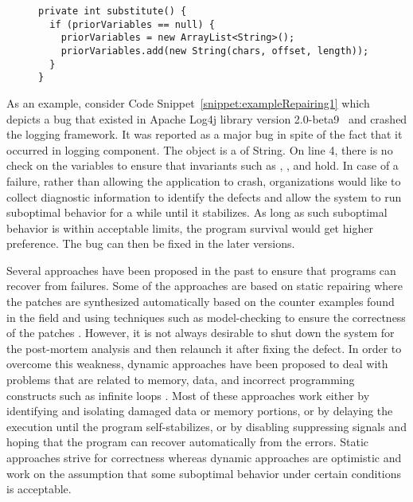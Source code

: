\lstset{language=Java , caption=Apache Log4j bug example,
label=snippet:exampleRepairing1}
\begin{figure}[t]
\begin{lstlisting}
private int substitute() {
  if (priorVariables == null) {
    priorVariables = new ArrayList<String>();
    priorVariables.add(new String(chars, offset, length));
  }
}
\end{lstlisting}
\end{figure}

As an example, consider Code Snippet~\ref{snippet:exampleRepairing1} which depicts a bug that
existed in Apache Log4j library version 2.0-beta9~\cite{ApacheLog4jBug} and crashed
the logging framework. It was reported as a major bug in
spite of the fact that it occurred in logging component. The object
 is a  of String. On line 4, there is no check on the variables to ensure
that invariants such as , , and  hold. In case of a failure, rather than allowing the application to crash, organizations would
like to collect diagnostic information to identify the defects and allow the system to run suboptimal behavior
for a while until it stabilizes. As long as such suboptimal behavior is within acceptable
limits, the program survival would get higher preference. The bug can then be
fixed in the later versions.

Several approaches have been proposed in the past to ensure that programs can
recover from failures. Some of the approaches are based on static repairing
where the patches are synthesized automatically based on the counter examples
found in the field and using techniques such as model-checking to ensure the
correctness of the patches \cite{}.
However, it is not always desirable to shut down the system for the post-mortem analysis and then relaunch it
after fixing the defect. In order to overcome this weakness,
dynamic approaches have been proposed to deal with problems that are
related to memory, data, and incorrect programming constructs such as infinite
loops \cite{}. Most of these approaches work either by identifying and isolating
damaged data or memory portions, or by delaying the execution until the program
self-stabilizes, or by disabling suppressing signals and hoping that the
program can recover automatically from the errors. Static approaches strive
for correctness whereas dynamic approaches are optimistic and work on the
assumption that some suboptimal behavior under certain conditions is acceptable.

